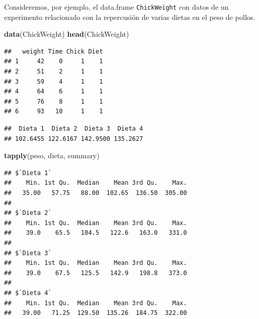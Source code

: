 \documentclass[]{book}
\newenvironment{Shaded}{\begin{snugshade}}{\end{snugshade}}
\newcommand{\KeywordTok}[1]{\textcolor[rgb]{0.13,0.29,0.53}{\textbf{#1}}}
\newcommand{\StringTok}[1]{\textcolor[rgb]{0.31,0.60,0.02}{#1}}
\newcommand{\CommentTok}[1]{\textcolor[rgb]{0.56,0.35,0.01}{\textit{#1}}}
\newcommand{\OperatorTok}[1]{\textcolor[rgb]{0.81,0.36,0.00}{\textbf{#1}}}
\newcommand{\NormalTok}[1]{#1}
\begin{document}
Consideremos, por ejemplo, el data.frame \texttt{ChickWeight} con datos
de un experimento relacionado con la repercusión de varias dietas en el
peso de pollos.

\begin{Shaded}
\begin{Highlighting}[]
\KeywordTok{data}\NormalTok{(ChickWeight)}
\KeywordTok{head}\NormalTok{(ChickWeight)}
\end{Highlighting}
\end{Shaded}

\begin{verbatim}
##   weight Time Chick Diet
## 1     42    0     1    1
## 2     51    2     1    1
## 3     59    4     1    1
## 4     64    6     1    1
## 5     76    8     1    1
## 6     93   10     1    1
\end{verbatim}

\begin{Shaded}
\end{Shaded}

\begin{verbatim}
##  Dieta 1  Dieta 2  Dieta 3  Dieta 4 
## 102.6455 122.6167 142.9500 135.2627
\end{verbatim}

\begin{Shaded}
\begin{Highlighting}[]
\KeywordTok{tapply}\NormalTok{(peso, dieta, summary)}
\end{Highlighting}
\end{Shaded}

\begin{verbatim}
## $`Dieta 1`
##    Min. 1st Qu.  Median    Mean 3rd Qu.    Max. 
##   35.00   57.75   88.00  102.65  136.50  305.00 
## 
## $`Dieta 2`
##    Min. 1st Qu.  Median    Mean 3rd Qu.    Max. 
##    39.0    65.5   104.5   122.6   163.0   331.0 
## 
## $`Dieta 3`
##    Min. 1st Qu.  Median    Mean 3rd Qu.    Max. 
##    39.0    67.5   125.5   142.9   198.8   373.0 
## 
## $`Dieta 4`
##    Min. 1st Qu.  Median    Mean 3rd Qu.    Max. 
##   39.00   71.25  129.50  135.26  184.75  322.00
\end{verbatim}
\end{document}
